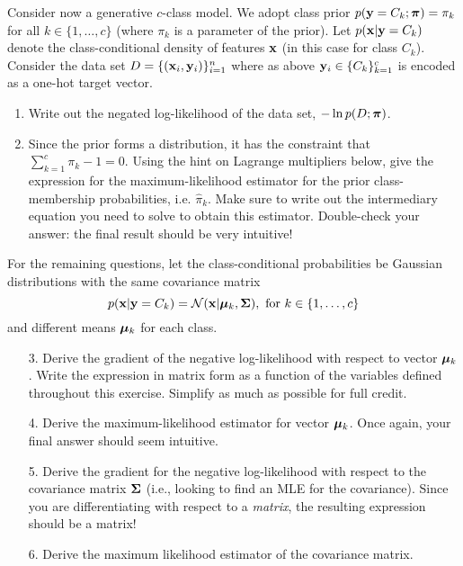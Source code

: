 \documentclass[submit]{harvardml}
\begin{document}
\begin{problem}
  Consider now a generative $c$-class model.  We adopt class prior
  $p(\mathbf{y} = C_k; \boldsymbol{\pi}) = \pi_k$ for all $k \in \{1, \ldots, c\}$
(where $\pi_k$ is a parameter of the prior).
%
Let  $p(\mathbf{x}|\mathbf{y}=C_k)$ denote
the class-conditional density of features $\mathbf{x}$ (in this
case for class $C_k$). Consider the data set $D = \{(\mathbf{x}_i,
\mathbf{y}_i)\}_{i=1}^n$ where as above $\mathbf{y}_i \in \{C_k\}_{k=1}^c$ is
encoded as a one-hot target vector.
%
\begin{enumerate}
  \item Write out the negated log-likelihood of the data set,
    $-\ln p(D ; \boldsymbol{\pi})$.
%
  \item Since the prior forms a distribution, it has the constraint that
    $\sum_{k=1}^c\pi_k - 1 = 0$.  Using the hint on
Lagrange multipliers below, give the
    expression for the maximum-likelihood estimator for the prior
    class-membership probabilities, i.e.
    $\hat \pi_k.$
    Make sure to write out the intermediary equation you need
    to solve to obtain this estimator. Double-check your answer: the final
    result should be very intuitive!
\end{enumerate}
    For the remaining questions, let the
    class-conditional probabilities be Gaussian distributions with
the same covariance matrix
    $$p(\mathbf{x} | \mathbf{y} = C_k) = \mathcal{N}(\mathbf{x} |  \boldsymbol{\mu}_k, \mathbf{\Sigma}), \text{\ for\ }k \in \{1,\ldots, c\}$$
%
and different means $\boldsymbol{\mu}_k$ for each class.
%
    \begin{enumerate}
  \item[3.] Derive the gradient of the negative log-likelihood with respect to vector $\boldsymbol{\mu}_k$.
    Write the expression in matrix form as a function of the variables defined
    throughout this exercise. Simplify as much as possible for full credit.
  \item[4.] Derive the maximum-likelihood estimator for vector $\boldsymbol{\mu}_k$. Once
    again, your final answer should seem intuitive.
  \item[5.] Derive the gradient for the negative log-likelihood with respect to the
    covariance matrix $\mathbf{\Sigma}$ (i.e., looking
to find an MLE for the covariance).
Since you are differentiating with respect to a
    \emph{matrix}, the resulting expression should be a matrix!
%
  \item[6.] Derive the maximum likelihood estimator of the covariance matrix.
\end{enumerate}

\end{problem}
\end{document}
